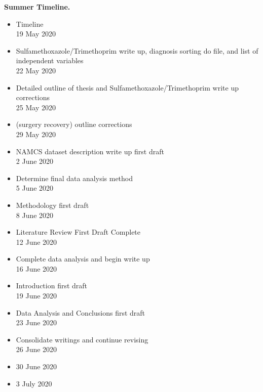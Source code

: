 \noindent \textbf{Summer Timeline.}
\begin{itemize}
    \item Timeline\\
    19 May 2020
    
    \item Sulfamethoxazole/Trimethoprim write up, diagnosis sorting do file, and list of independent variables\\
    22 May 2020
    
    \item Detailed outline of thesis and Sulfamethoxazole/Trimethoprim write up corrections\\
    25 May 2020

    \item (surgery recovery) outline corrections\\
    29 May 2020

    \item NAMCS dataset description write up first draft\\
    2 June 2020

    \item Determine final data analysis method\\
    5 June 2020

    \item Methodology first draft\\
    8 June 2020

    \item Literature Review First Draft Complete\\
    12 June 2020

    \item Complete data analysis and begin write up\\
    16 June 2020
    
    \item Introduction first draft\\
    19 June 2020

    \item Data Analysis and Conclusions first draft\\
    23 June 2020

    \item Consolidate writings and continue revising\\
    26 June 2020

    \item 30 June 2020

    \item 3 July 2020


\end{itemize}
